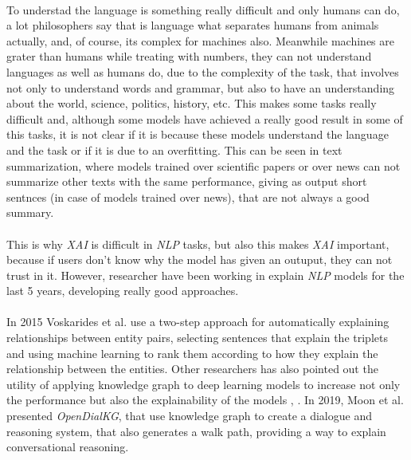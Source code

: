\paragraph{}
To understad the language is something really difficult and only humans can do, a lot philosophers say that is language what separates humans from animals actually, and, of course, its complex for machines also. Meanwhile machines are grater than humans while treating with numbers, they can not understand languages as well as humans do, due to the complexity of the task, that involves not only to understand words and grammar, but also to have an understanding about the world, science, politics, history, etc. This makes some tasks really difficult and, although some models have achieved a really good result in some of this tasks, it is not clear if it is because these models understand the language and the task or if it is due to an overfitting. This can be seen in text summarization, where models trained over scientific papers or over news can not summarize other texts with the same performance, giving as output short sentnces (in case of models trained over news), that are not always a good summary.
\paragraph{}
This is why \emph{XAI} is difficult in \emph{NLP} tasks, but also this makes \emph{XAI} important, because if users don't know why the model has given an outuput, they can not trust in it. However, researcher have been working in explain \emph{NLP} models for the last 5 years, developing really good approaches.
\paragraph{}
In 2015 Voskarides et al.\cite{Voskarides2015} use a two-step approach for automatically explaining relationships between entity pairs, selecting sentences that explain the triplets and using machine learning to rank them according to how they explain the relationship between the entities. Other researchers has also pointed out the utility of applying knowledge graph to deep learning models to increase not only the performance but also the explainability of the models \cite{Palmonari2020}, \cite{Lecue2020}. In 2019, Moon et al. presented \emph{OpenDialKG}\cite{Moon2019}, that use knowledge graph to create a dialogue and reasoning system, that also generates a walk path, providing a way to explain conversational reasoning. 
